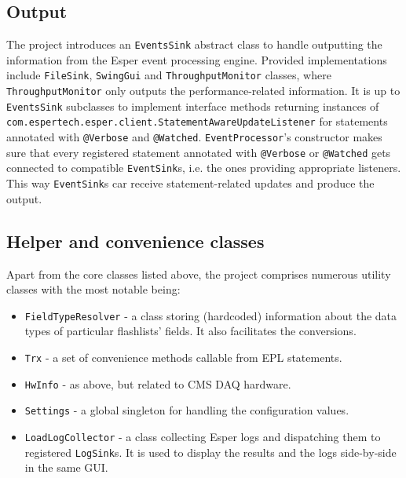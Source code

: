 \subsection{Output}

The project introduces an \texttt{EventsSink} abstract class to handle outputting the information from the Esper event processing engine. Provided implementations include \texttt{FileSink}, \texttt{SwingGui} and \texttt{ThroughputMonitor} classes, where \texttt{ThroughputMonitor} only outputs the performance-related information. It is up to \texttt{EventsSink} subclasses to implement interface methods returning
instances of \texttt{com.espertech.esper.client.StatementAwareUpdateListener} for statements annotated with \texttt{@Verbose} and \texttt{@Watched}. 
\texttt{EventProcessor}'s constructor makes sure that every registered statement annotated with \texttt{@Verbose} or \texttt{@Watched} gets connected to compatible \texttt{EventSink}s, i.e. the ones providing appropriate listeners. This way \texttt{EventSink}s car receive statement-related updates and produce the output.


\subsection{Helper and convenience classes}

Apart from the core classes listed above, the project comprises numerous utility classes with the most notable being:

\begin{itemize}
	\item \texttt{FieldTypeResolver} - a class storing (hardcoded) information about the data types of particular flashlists' fields. It also facilitates the conversions.
	\item \texttt{Trx} - a set of convenience methods callable from EPL statements.
	\item \texttt{HwInfo} - as above, but related to CMS DAQ hardware.
	\item \texttt{Settings} - a global singleton for handling the configuration values.
	\item \texttt{LoadLogCollector} - a class collecting Esper logs and dispatching them to registered \texttt{LogSink}s. It is used to display the results and the logs side-by-side in the same GUI.
\end{itemize}